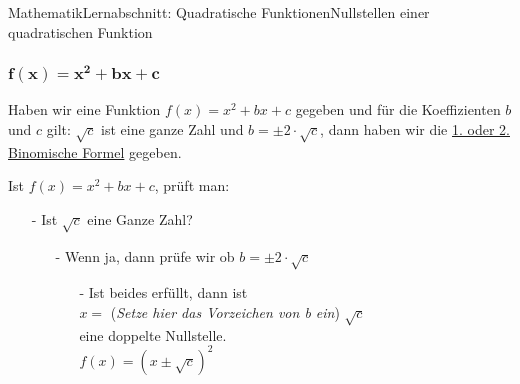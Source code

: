 \documentclass[11pt,twocolumn,oneside,openany,headings=optiontotoc,11pt,numbers=noenddot]{article}
\begin{document}
\begin{worksheet}{Mathematik}{Lernabschnitt: Quadratische Funktionen}{Nullstellen einer quadratischen Funktion}
		\subsubsection*{\(\mathbf{f(x) = x^2 + bx + c}\)}
		Haben wir eine Funktion \(f(x) = x^2 + bx + c\) gegeben und für die Koeffizienten \(b\) und \(c\) gilt: \(\sqrt{c}\) ist eine ganze Zahl und \(b = \pm{}2\cdot\sqrt{c}\), dann haben wir die \underline{1. oder 2. Binomische Formel} gegeben.\\
		\par\noindent
		Ist \(f(x) = x^2 + bx + c\), prüft man:
		\begin{itemize}
			\item[-] Ist \(\sqrt{c}\) eine Ganze Zahl?
			\begin{itemize}
				\item[-] Wenn ja, dann prüfe wir ob \( b = \pm{}2\cdot\sqrt{c}\)
				\begin{itemize}
					\item[-] Ist beides erfüllt, dann ist\\
					\(x =\) (\textit{\tiny{Setze hier das Vorzeichen von b ein}}) \(\sqrt{c}\)\\
					eine doppelte Nullstelle.\\
					\(f(x) = (x\pm\sqrt{c})^2\)
				\end{itemize}
			\end{itemize}
		\end{itemize}

\end{worksheet}
\end{document}
